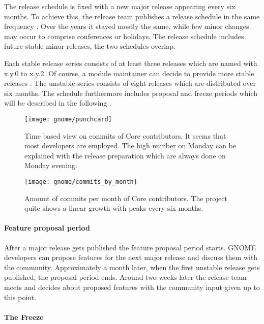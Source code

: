 The release schedule is fixed with a new major release appearing every six
months. To achieve this, the release team publishes a release schedule in the
same frequency \cite{GNOMEDevelopmentSchedule}. Over the years it stayed mostly
the same, while few minor changes may occur to comprise conferences or
holidays. The release schedule includes future stable minor releases, the two
schedules overlap.

Each stable release series consists of at least three releases which are named
with x.y.0 to x.y.2. Of course, a module maintainer can decide to provide more
stable releases \cite{GNOMEReleaseTeam}. The unstable series consists of eight
releases which are distributed over six months. The schedule furthermore
includes proposal and freeze periods which will be described in the following
\cite{GNOMEDevelopmentSchedule,GNOMESchedule}.

\begin{figure}[hbtp]
  \centering
  \texttt{[image: gnome/punchcard]}
  \caption[Time based view on commits, GNOME]
  {Time based view on commits of Core contributors. It seems that most
    developers are employed. The high number on Monday can be explained with
    the release preparation which are always done on Monday evening.}
\end{figure}

\begin{figure}[htbp]
  \centering
  \texttt{[image: gnome/commits\_by\_month]}
  \caption[Commits by month, GNOME]
  {Amount of commits per month of Core contributors. The project quite shows a
    linear growth with peaks every six months.}
\end{figure}

\paragraph{Feature proposal period}

After a major release gets published the feature proposal period starts. GNOME
developers can propose features for the next major release and discuss them
with the community. Approximately a month later, when the first unstable
release gets published, the proposal period ends. Around two weeks later the
release team meets and decides about proposed features with the community input
given up to this point.

\paragraph{The Freeze}

